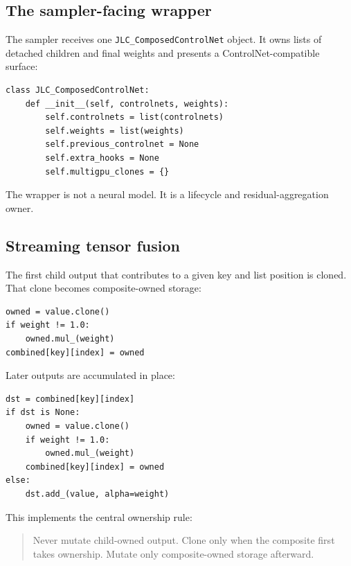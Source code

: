 \documentclass[11pt]{article}
\newcommand{\code}[1]{\texttt{#1}}
\begin{document}
\subsection{The sampler-facing wrapper}

The sampler receives one \code{JLC\_ComposedControlNet} object. It owns lists of detached children and final weights and presents a ControlNet-compatible surface:

\begin{lstlisting}[style=pythonstyle,caption={Essential wrapper state.}]
class JLC_ComposedControlNet:
    def __init__(self, controlnets, weights):
        self.controlnets = list(controlnets)
        self.weights = list(weights)
        self.previous_controlnet = None
        self.extra_hooks = None
        self.multigpu_clones = {}
\end{lstlisting}

The wrapper is not a neural model. It is a lifecycle and residual-aggregation owner.

\subsection{Streaming tensor fusion}

The first child output that contributes to a given key and list position is cloned. That clone becomes composite-owned storage:

\begin{lstlisting}[style=pythonstyle,caption={First-output ownership.}]
owned = value.clone()
if weight != 1.0:
    owned.mul_(weight)
combined[key][index] = owned
\end{lstlisting}

Later outputs are accumulated in place:

\begin{lstlisting}[style=pythonstyle,caption={Later weighted accumulation.}]
dst = combined[key][index]
if dst is None:
    owned = value.clone()
    if weight != 1.0:
        owned.mul_(weight)
    combined[key][index] = owned
else:
    dst.add_(value, alpha=weight)
\end{lstlisting}

This implements the central ownership rule:

\begin{quote}
Never mutate child-owned output. Clone only when the composite first takes ownership. Mutate only composite-owned storage afterward.
\end{quote}
\end{document}
